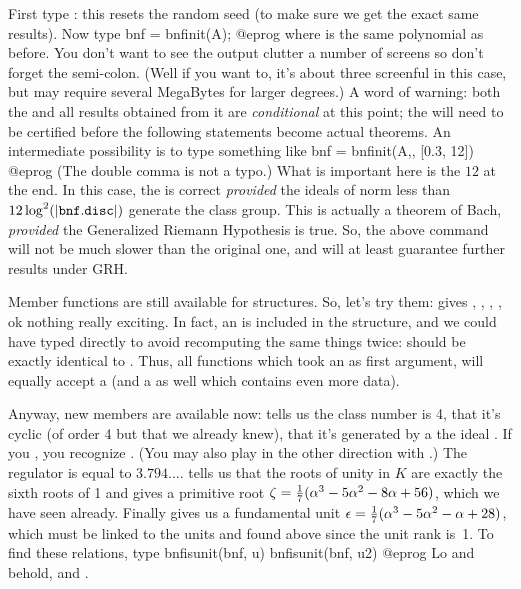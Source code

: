 First type : this resets the random seed (to make sure we get
the exact same results). Now type
\bprog
 bnf = bnfinit(A);
@eprog\noindent
where  is the same polynomial as before. You don't want to see the
output clutter a number of screens so don't forget the semi-colon. (Well
if you want to, it's about three screenful in this case, but may require
several MegaBytes for larger degrees.) A word of warning: both the 
and all results obtained from it are \emph{conditional} at this point; the
 will need to be certified before the following statements become
actual theorems. An intermediate possibility is to type something like
\bprog
  bnf = bnfinit(A,, [0.3, 12])
@eprog\noindent
(The double comma is not a typo.) What is important here is the $12$ at the
end. In this case, the  is correct \emph{provided} the ideals
of norm less than $12\log^2(|{\tt bnf.disc}|)$ generate the class group.
This is actually a theorem of Bach, \emph{provided} the Generalized Riemann
Hypothesis is true. So, the above command will not be much slower than the
original one, and will at least guarantee further results under GRH. 
\smallskip

Member functions are still available for  structures. So, let's try
them:  gives , , ,
, ok nothing really exciting. In fact, an  is included
in the  structure, and we could have typed 
directly to avoid recomputing the same things twice:  should be
exactly identical to . Thus, all functions which took an  as
first argument, will equally accept a  (and a  as well
which contains even more data).

Anyway, new members are available now:  tells us the class number
is 4,  that it's cyclic (of order 4 but that we already knew),
 that it's generated by a the ideal . If you
, you recognize . (You may also play in
the other direction with .) The regulator  is
equal to $3.794\dots$.  tells us that the roots of unity in $K$
are exactly the sixth roots of 1 and gives a primitive root $\zeta =
{1\over7}(\alpha^3 - 5\alpha^2 - 8\alpha + 56)$, which we have seen already.
Finally  gives us a fundamental unit $\epsilon =
{1\over7}(\alpha^3 - 5\alpha^2 - \alpha + 28)$, which must be linked to the
units  and  found above since the unit rank is~1. To find
these relations, type
\bprog
  bnfisunit(bnf, u)
  bnfisunit(bnf, u2)
@eprog\noindent
Lo and behold,  and .

